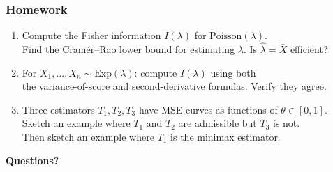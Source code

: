 \documentclass[aspectratio=169]{beamer}
\begin{document}
\begin{frame}
\frametitle{Homework}
\begin{enumerate}
  \item Compute the Fisher information $I(\lambda)$ for $\text{Poisson}(\lambda)$.\\
    Find the Cram\'er--Rao lower bound for estimating $\lambda$.
    Is $\hat\lambda = \bar{X}$ efficient?

  \vspace{0.15cm}
  \item For $X_1, \ldots, X_n \sim \text{Exp}(\lambda)$: compute $I(\lambda)$ using both\\
    the variance-of-score and second-derivative formulas. Verify they agree.

  \vspace{0.15cm}
  \item Three estimators $T_1, T_2, T_3$ have MSE curves as functions of $\theta \in [0,1]$.\\
    Sketch an example where $T_1$ and $T_2$ are admissible but $T_3$ is not.\\
    Then sketch an example where $T_1$ is the minimax estimator.
\end{enumerate}
\end{frame}

\begin{frame}
\begin{center}
  {\Huge\bfseries\textcolor{popblue}{Questions?}}
\end{center}
\end{frame}
\end{document}
